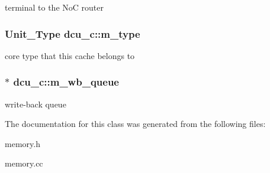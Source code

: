 \label{classdcu__c_a3db9363af3f49592efb1edd8014c2736}
terminal to the NoC router \hypertarget{classdcu__c_ab99a3a4fa14c08b977f91ea53e2d2d8c}{
\subsubsection[{m\_\-type}]{\setlength{\rightskip}{0pt plus 5cm}Unit\_\-Type {\bf dcu\_\-c::m\_\-type}}}
\label{classdcu__c_ab99a3a4fa14c08b977f91ea53e2d2d8c}
core type that this cache belongs to \hypertarget{classdcu__c_a11e746c9849d96d00f6181626d6da7f4}{
\subsubsection[{m\_\-wb\_\-queue}]{$\ast$ {\bf dcu\_\-c::m\_\-wb\_\-queue}}}
\label{classdcu__c_a11e746c9849d96d00f6181626d6da7f4}
write-\/back queue 

The documentation for this class was generated from the following files:\begin{DoxyCompactItemize}
\item 
memory.h\item 
memory.cc\end{DoxyCompactItemize}
